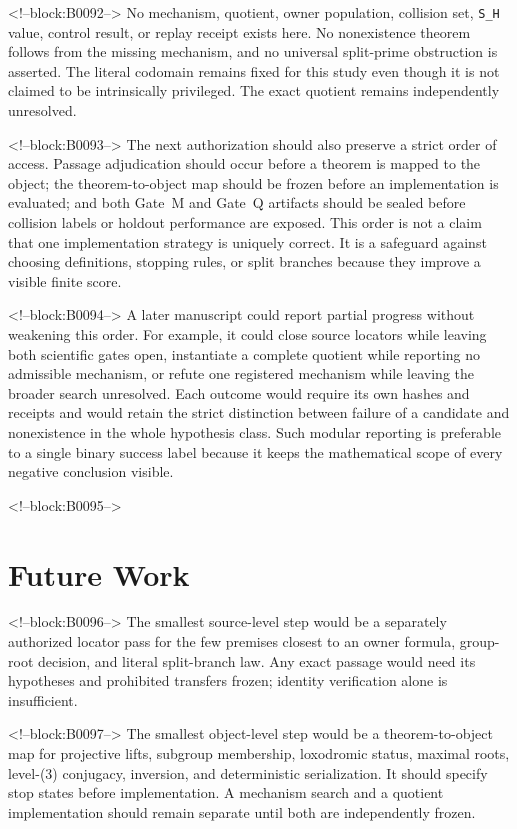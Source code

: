 \documentclass[11pt,a4paper]{article}
\begin{document}
<!--block:B0092-->
No mechanism, quotient, owner population, collision set, \texttt{S\_H} value, control result, or replay receipt exists here. No nonexistence theorem follows from the missing mechanism, and no universal split-prime obstruction is asserted. The literal codomain remains fixed for this study even though it is not claimed to be intrinsically privileged. The exact quotient remains independently unresolved.

<!--block:B0093-->
The next authorization should also preserve a strict order of access. Passage adjudication should occur before a theorem is mapped to the object; the theorem-to-object map should be frozen before an implementation is evaluated; and both Gate~M and Gate~Q artifacts should be sealed before collision labels or holdout performance are exposed. This order is not a claim that one implementation strategy is uniquely correct. It is a safeguard against choosing definitions, stopping rules, or split branches because they improve a visible finite score.

<!--block:B0094-->
A later manuscript could report partial progress without weakening this order. For example, it could close source locators while leaving both scientific gates open, instantiate a complete quotient while reporting no admissible mechanism, or refute one registered mechanism while leaving the broader search unresolved. Each outcome would require its own hashes and receipts and would retain the strict distinction between failure of a candidate and nonexistence in the whole hypothesis class. Such modular reporting is preferable to a single binary success label because it keeps the mathematical scope of every negative conclusion visible.

<!--block:B0095-->
\section{Future Work}

<!--block:B0096-->
The smallest source-level step would be a separately authorized locator pass for the few premises closest to an owner formula, group-root decision, and literal split-branch law. Any exact passage would need its hypotheses and prohibited transfers frozen; identity verification alone is insufficient.

<!--block:B0097-->
The smallest object-level step would be a theorem-to-object map for projective lifts, subgroup membership, loxodromic status, maximal roots, level-(3) conjugacy, inversion, and deterministic serialization. It should specify stop states before implementation. A mechanism search and a quotient implementation should remain separate until both are independently frozen.
\end{document}
